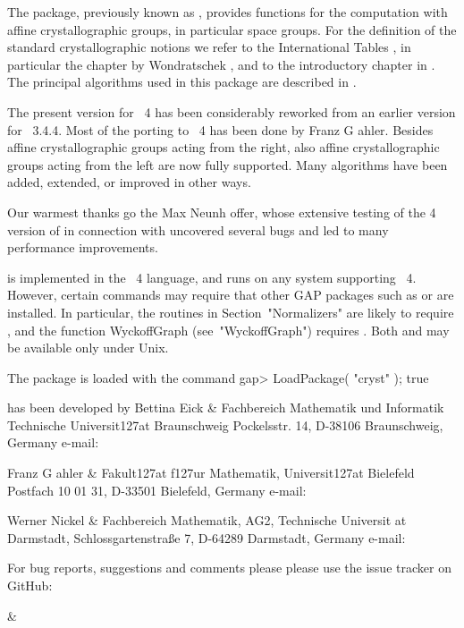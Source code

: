 

The {\Cryst} package, previously known as , provides 
functions for the computation with affine crystallographic groups, 
in particular space groups. For the definition of the standard 
crystallographic notions we refer to the International Tables 
\cite{Hah95}, in particular the chapter by Wondratschek \cite{Won95},
and to the introductory chapter in \cite{BBNWZ78}. The principal 
algorithms used in this package are described in \cite{EGN97}.

The present version for {\GAP}~4 has been considerably reworked from
an earlier version for {\GAP}~3.4.4. Most of the porting to {\GAP}~4
has been done by Franz G{ a}hler. Besides affine crystallographic
groups acting from the right, also affine crystallographic groups acting 
from the left are now fully supported. Many algorithms have been added, 
extended, or improved in other ways.

Our warmest thanks go the Max Neunh{ o}ffer, whose extensive
testing of the {\GAP} 4 version of {\Cryst} in connection with {\XGAP} 
uncovered several bugs and led to many performance improvements.

{\Cryst} is implemented in the {\GAP}~4 language, and runs on any 
system supporting {\GAP}~4. However, certain commands may require 
that other GAP packages such as {\CaratInterface} or {\XGAP} are installed.
In particular, the routines in Section~"Normalizers" are likely
to require {\CaratInterface}, and the function WyckoffGraph (see~"WyckoffGraph")
requires {\XGAP}. Both {\CaratInterface} and {\XGAP} may be available
only under Unix.

The {\Cryst} package is loaded with the command
\beginexample 
gap> LoadPackage( "cryst" ); 
true
\endexample

{\Cryst} has been developed by
\beginitems
Bettina Eick &
Fachbereich Mathematik und Informatik\hfil\break
Technische Universit\accent127at Braunschweig\hfil\break
Pockelsstr. 14, D-38106 Braunschweig, Germany\hfil\break
e-mail: 

Franz G{ a}hler &
Fakult\accent127at f\accent127ur Mathematik, 
Universit\accent127at Bielefeld\hfil\break
Postfach 10 01 31, D-33501 Bielefeld, Germany\hfil\break
e-mail: 

Werner Nickel &
Fachbereich Mathematik, AG2,
Technische Universit{ a}t Darmstadt, \hfill\break
Schlossgartenstra{\ss}e 7, D-64289 Darmstadt, Germany \hfil\break
e-mail: 
\enditems

For bug reports, suggestions and comments please please use
the issue tracker on GitHub:

\beginitems
&
\enditems

